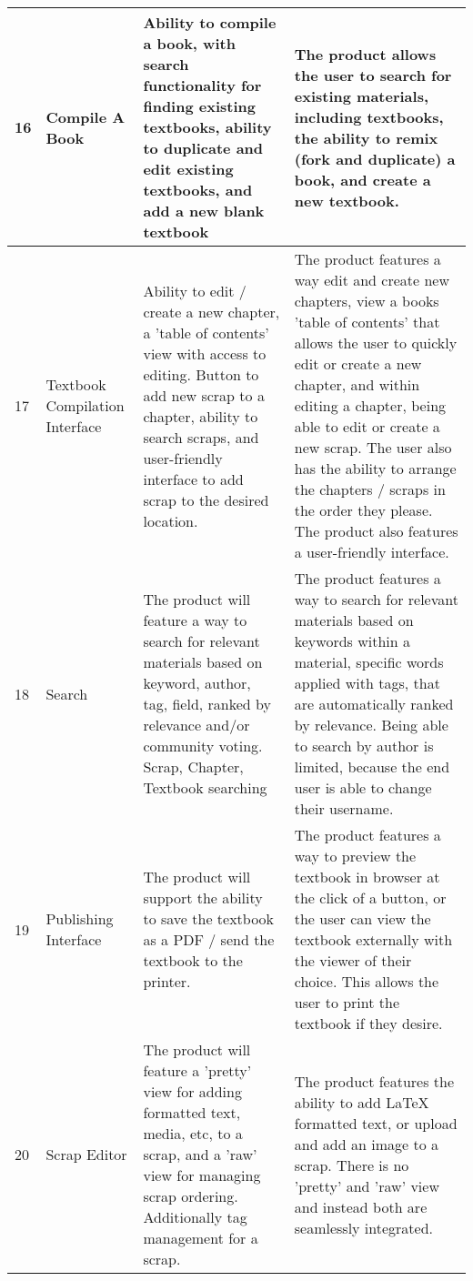 \documentclass[onecolumn, draftclsnofoot,10pt, compsoc]{IEEEtran}
\begin{document}
\begin{flushleft}
\begin{supertabular}{|p{0.5cm}|p{3cm}|p{5.5cm}|p{7cm}|}
		16 & Compile A Book & Ability to compile a book, with search functionality for finding existing textbooks, ability to duplicate and edit existing textbooks, and add a new blank textbook & The product allows the user to search for existing materials, including textbooks, the ability to remix (fork and duplicate) a book, and create a new textbook.
		\\ \hline
		
		17 & Textbook Compilation Interface & Ability to edit / create a new chapter, a 'table of contents' view with access to editing. Button to add new scrap to a chapter, ability to search scraps, and user-friendly interface to add scrap to the desired location. & The product features a way edit and create new chapters, view a books 'table of contents' that allows the user to quickly edit or create a new chapter, and within editing a chapter, being able to edit or create a new scrap. The user also has the ability to arrange the chapters / scraps in the order they please. The product also features a user-friendly interface.
		\\ \hline
		
		18 & Search & The product will feature a way to search for relevant materials based on keyword, author, tag, field, ranked by relevance and/or community voting. Scrap, Chapter, Textbook searching & The product features a way to search for relevant materials based on keywords within a material, specific words applied with tags, that are automatically ranked by relevance. Being able to search by author is limited, because the end user is able to change their username. 
		\\ \hline
		
		19 & Publishing Interface & The product will support the ability to save the textbook as a PDF / send the textbook to the printer. & The product features a way to preview the textbook in browser at the click of a button, or the user can view the textbook externally with the viewer of their choice. This allows the user to print the textbook if they desire.
		\\ \hline
		
		20 & Scrap Editor & The product will feature a 'pretty' view for adding formatted text, media, etc, to a scrap, and a 'raw' view for managing scrap ordering. Additionally tag management for a scrap. & The product features the ability to add LaTeX formatted text, or upload and add an image to a scrap. There is no 'pretty' and 'raw' view and instead both are seamlessly integrated.
		\\ \hline
		
	\end{supertabular}
\end{flushleft}
\end{document}
